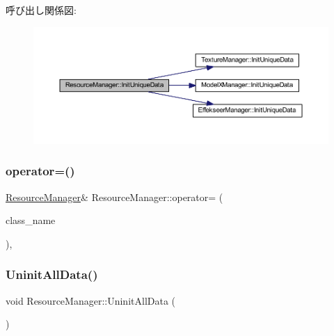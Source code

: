 呼び出し関係図\+:
\nopagebreak
\begin{figure}[H]
\begin{center}
\leavevmode
\includegraphics[width=350pt]{class_resource_manager_ab1ea00fb7eb4006bb9cbb48612da2c79_cgraph}
\end{center}
\end{figure}
\mbox{\label{class_resource_manager_a9c420ee8ffde51a27fe6ca37229ffa83}} 
\subsubsection{\texorpdfstring{operator=()}{operator=()}}
{\footnotesize\ttfamily \mbox{\hyperlink{class_resource_manager}{Resource\+Manager}}\& Resource\+Manager\+::operator= (\begin{DoxyParamCaption}\item[{const \mbox{\hyperlink{class_resource_manager}{Resource\+Manager}} \&}]{class\+\_\+name }\end{DoxyParamCaption})\hspace{0.3cm}{\ttfamily [private]}, {\ttfamily [delete]}}

\mbox{\label{class_resource_manager_a8d96f0a74a92212e8b2948467bb3cac7}} 
\subsubsection{\texorpdfstring{Uninit\+All\+Data()}{UninitAllData()}}
{\footnotesize\ttfamily void Resource\+Manager\+::\+Uninit\+All\+Data (\begin{DoxyParamCaption}{ }\end{DoxyParamCaption})\hspace{0.3cm}{\ttfamily [static]}}



